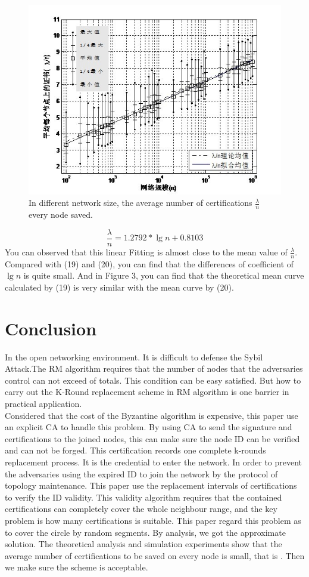 \documentclass[10pt]{article}
\begin{document}
\begin{figure}[htbp]
\centering
\includegraphics[bb=0 0 410 307,scale=.8]{3.jpg}
\caption{In different network size, the average number of certifications $ \frac{\lambda}{n} $ every node saved.}
\label{fig:f3}
\end{figure}
\begin{equation}
    \frac{\lambda}{n}=1.2792*\lg{n}+0.8103
\end{equation}
You can observed that this linear Fitting is almost close to the mean value of $\frac{\lambda}{n}$. Compared with (19) and (20), you can find that the differences of coefficient of $\lg{n}$ is quite small. And in Figure 3, you can find that the theoretical mean curve calculated by (19) is very similar with the mean curve by (20).  
\section{Conclusion}
In the open networking environment. It is difficult to defense the Sybil Attack.The RM algorithm requires that the number of nodes that the adversaries control can not exceed   of totals. This condition can be easy satisfied. But how to carry out the K-Round replacement scheme in RM algorithm is one barrier in practical application.\\
Considered that the cost of the Byzantine algorithm is expensive, this paper use an explicit CA to handle this problem. By using CA to send the signature and certifications to the joined nodes, this can make sure the node ID can be verified and can not be forged. This certification records one complete k-rounds replacement process. It is the credential to enter the network. In order to prevent the adversaries using the expired ID to join the network by the protocol of topology maintenance. This paper use the replacement intervals of certifications to verify the ID validity. This validity algorithm requires that the contained certifications can completely cover the whole neighbour range, and the key problem is how many certifications is suitable. This paper regard this problem as to cover the circle by random segments. By analysis, we got the approximate solution. The theoretical analysis and simulation experiments show that the average number of certifications to be saved on every node is small, that is  . Then we make sure the scheme is acceptable. 
\end{document}
